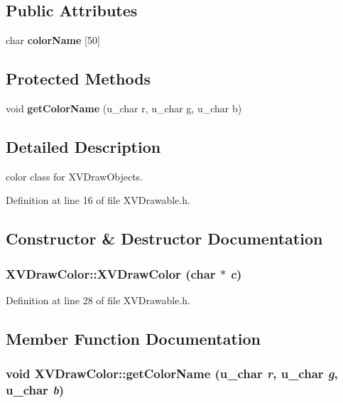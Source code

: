 \subsection*{Public Attributes}
\begin{CompactItemize}
\item 
char {\bf color\-Name} \mbox{[}50\mbox{]}
\end{CompactItemize}
\subsection*{Protected Methods}
\begin{CompactItemize}
\item 
void {\bf get\-Color\-Name} (u\_\-char r, u\_\-char g, u\_\-char b)
\end{CompactItemize}


\subsection{Detailed Description}
color class for XVDraw\-Objects.





Definition at line 16 of file XVDrawable.h.

\subsection{Constructor \& Destructor Documentation}
\label{XVDrawColor_a0}
\hypertarget{class_XVDrawColor_a0}{
\subsubsection[XVDrawColor]{\setlength{\rightskip}{0pt plus 5cm}XVDraw\-Color::XVDraw\-Color (char $\ast$ {\em c})}}




Definition at line 28 of file XVDrawable.h.

\subsection{Member Function Documentation}
\label{XVDrawColor_b0}
\hypertarget{class_XVDrawColor_b0}{
\subsubsection[getColorName]{\setlength{\rightskip}{0pt plus 5cm}void XVDraw\-Color::get\-Color\-Name (u\_\-char {\em r}, u\_\-char {\em g}, u\_\-char {\em b})}}




